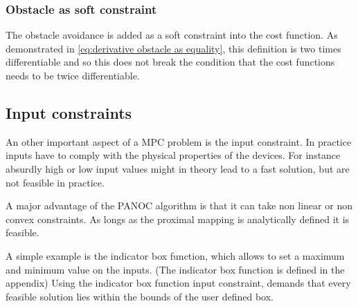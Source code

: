 			\subsubsection{Obstacle as soft constraint}
				The obstacle avoidance is added as a soft constraint into the cost function. As demonstrated in \eqref{eq:derivative obstacle as equality}, this definition is two times differentiable and so this does not break the condition that the cost functions needs to be twice differentiable.
			
		\subsection{Input constraints}
			An other important aspect of a MPC problem is the input constraint. In practice inputs have to comply with the physical properties of the devices. For instance absurdly high or low input values might in theory lead to a fast solution, but are not feasible in practice.
			
			A major advantage of the PANOC algorithm is that it can take non linear or non convex constraints. As longs as the proximal mapping is analytically defined it is feasible. 
			
			A simple example is the indicator box function, which allows to set a maximum and minimum value on the inputs. (The indicator box function is defined in the appendix) Using the  indicator box function input constraint, demands that every feasible solution lies within the bounds of the user defined box.